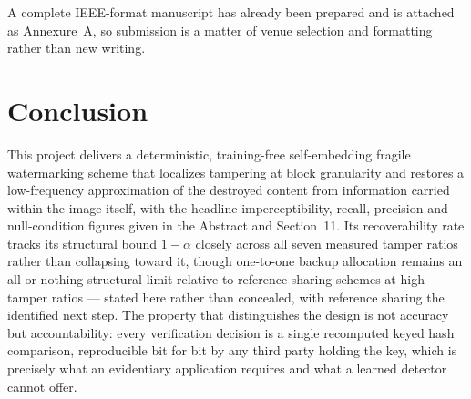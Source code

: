 \documentclass[12pt,a4paper]{article}
\begin{document}
A complete IEEE-format manuscript has already been prepared and is attached
as Annexure~A, so submission is a matter of venue selection and formatting
rather than new writing.

\section{Conclusion}

This project delivers a deterministic, training-free self-embedding fragile
watermarking scheme that localizes tampering at block granularity and
restores a low-frequency approximation of the destroyed content from
information carried within the image itself, with the headline imperceptibility,
recall, precision and null-condition figures given in the Abstract and
Section~11. Its recoverability rate tracks its structural bound $1-\alpha$
closely across all seven measured tamper ratios rather than collapsing toward
it, though one-to-one backup allocation remains an all-or-nothing structural
limit relative to reference-sharing schemes at high tamper ratios --- stated
here rather than concealed, with reference sharing the identified next step.
The property that distinguishes the design is not accuracy but
accountability: every verification decision is a single recomputed keyed hash
comparison, reproducible bit for bit by any third party holding the key,
which is precisely what an evidentiary application requires and what a
learned detector cannot offer.
\end{document}

